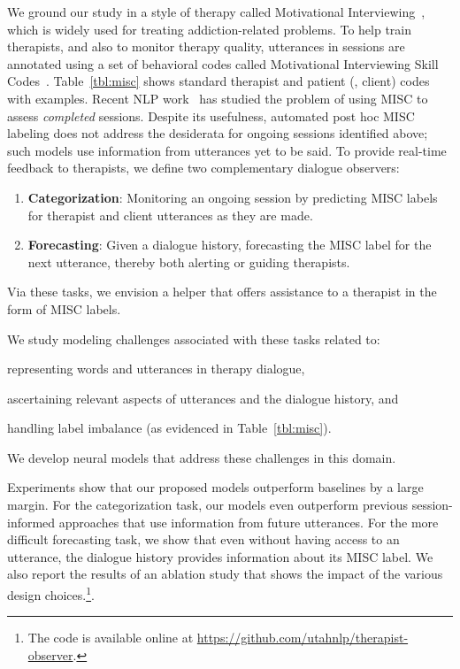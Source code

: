 
We ground our study in a style of therapy called Motivational
Interviewing~\cite[MI,][]{miller2003motivational,miller2012motivational},
which is widely used for treating addiction-related problems.
%
To help train therapists, and also to monitor therapy quality,
utterances in sessions are annotated using a set of behavioral codes
called Motivational Interviewing Skill
Codes~\cite[MISC,][]{miller2003manual}. Table~\ref{tbl:misc} shows
standard therapist and patient (\ie, client) codes with
examples. Recent NLP work~\cite[][{\em inter
  alia}]{tanana2016comparison, xiao2016behavioral,
  perez2017predicting, huang2018modeling} has studied the problem of
using MISC to assess \emph{completed} sessions.  Despite its
usefulness, automated post hoc MISC labeling does not address the
desiderata for ongoing sessions identified above; such models use
information from utterances yet to be said. To provide real-time
feedback to therapists, we define two complementary dialogue
observers:
\begin{enumerate}[nosep] 
\item \textbf{Categorization}: Monitoring an ongoing session by
  predicting MISC labels for therapist and client utterances as they
  are made.
\item \textbf{Forecasting}: Given a dialogue history, forecasting
  the MISC label for the next utterance, thereby both alerting or
  guiding therapists.
\end{enumerate}
Via these tasks, we envision a helper that offers assistance to a
therapist in the form of MISC labels.

We study modeling challenges associated with these tasks related to:
\begin{inparaenum}[(1)]
\item representing words and utterances in therapy dialogue,
\item ascertaining relevant aspects of utterances and the dialogue
  history, and
\item handling label imbalance (as evidenced in
  Table~\ref{tbl:misc}).
\end{inparaenum}
We develop neural models that address these challenges in this
domain.

Experiments show that our proposed models outperform baselines by a
large margin. For the categorization task, our models even
outperform previous session-informed approaches that use information
from future utterances. For the more difficult forecasting task, we
show that even without having access to an utterance, the dialogue
history provides information about its MISC label.  We also report
the results of an ablation study that shows the impact of the
various design choices.\footnote{The code is available online at
\url{https://github.com/utahnlp/therapist-observer}.}.%

